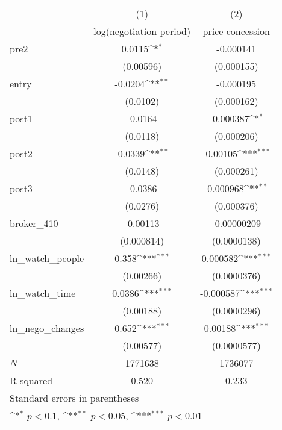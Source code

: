 {
\def\sym#1{\ifmmode^{#1}\else\(^{#1}\)\fi}
\begin{tabular}{l*{2}{c}}
\toprule
            &\multicolumn{1}{c}{(1)}&\multicolumn{1}{c}{(2)}\\
            &\multicolumn{1}{c}{log(negotiation period)}&\multicolumn{1}{c}{price concession}\\
\midrule
pre2        &      0.0115\sym{*}  &   -0.000141         \\
            &   (0.00596)         &  (0.000155)         \\
\addlinespace
entry       &     -0.0204\sym{**} &   -0.000195         \\
            &    (0.0102)         &  (0.000162)         \\
\addlinespace
post1       &     -0.0164         &   -0.000387\sym{*}  \\
            &    (0.0118)         &  (0.000206)         \\
\addlinespace
post2       &     -0.0339\sym{**} &    -0.00105\sym{***}\\
            &    (0.0148)         &  (0.000261)         \\
\addlinespace
post3       &     -0.0386         &   -0.000968\sym{**} \\
            &    (0.0276)         &  (0.000376)         \\
\addlinespace
broker\_410  &    -0.00113         & -0.00000209         \\
            &  (0.000814)         & (0.0000138)         \\
\addlinespace
ln\_watch\_people&       0.358\sym{***}&    0.000582\sym{***}\\
            &   (0.00266)         & (0.0000376)         \\
\addlinespace
ln\_watch\_time&      0.0386\sym{***}&   -0.000587\sym{***}\\
            &   (0.00188)         & (0.0000296)         \\
\addlinespace
ln\_nego\_changes&       0.652\sym{***}&     0.00188\sym{***}\\
            &   (0.00577)         & (0.0000577)         \\
\midrule
\(N\)       &     1771638         &     1736077         \\
R-squared   &       0.520         &       0.233         \\
\bottomrule
\multicolumn{3}{l}{\footnotesize Standard errors in parentheses}\\
\multicolumn{3}{l}{\footnotesize \sym{*} \(p<0.1\), \sym{**} \(p<0.05\), \sym{***} \(p<0.01\)}\\
\end{tabular}
}
